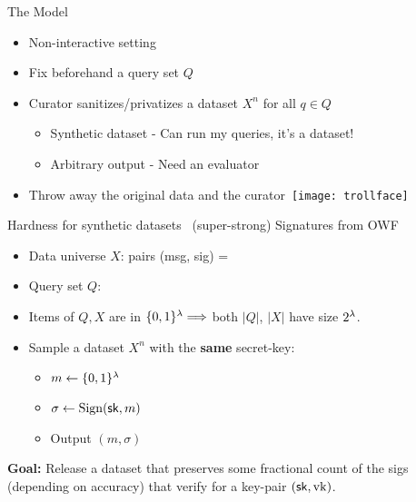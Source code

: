 \begin{frame}{The Model}
  \begin{itemize}
    \item Non-interactive setting
    \item Fix beforehand a query set $Q$
    \item Curator sanitizes/privatizes a dataset $X^n$ for all $q \in Q$
      \begin{itemize}
      \item Synthetic dataset - Can run my queries, it's a dataset!
      \item Arbitrary output - Need an evaluator
      \end{itemize}

    \item Throw away the original data and the curator~\texttt{[image: trollface]}
  \end{itemize}
\end{frame}

\begin{frame}{Hardness for synthetic datasets~\cite{conf/stoc/DworkNRRV09}}
  (super-strong) Signatures from OWF~\cite{conf/stoc/NaorY89,conf/stoc/Rompel90}
  \begin{itemize}
    \item Data universe $X$: pairs (msg, sig) = 
    \item Query set $Q$: 
    \item Items of $Q,X$ are in $\{0,1\}^\lambda \Longrightarrow$  both $|Q|$, $|X|$
      have size $2^\lambda$.
    \item Sample a dataset $X^n$ with the \textbf{same} secret-key:
      \begin{itemize}
        \item $m \leftarrow \{0,1\}^\lambda$ 
        \item $\sigma \leftarrow \mathrm{Sign}(\mathsf{sk}, m)$
        \item Output $(m, \sigma)$ 
       \end{itemize}
    \end{itemize}
    
    \vspace{2em}
    \textbf{Goal:} Release a dataset that preserves some fractional count of
    the sigs (depending on accuracy) that verify for a key-pair $(\mathsf{sk},\mathrm{vk})$.
  \end{frame}

